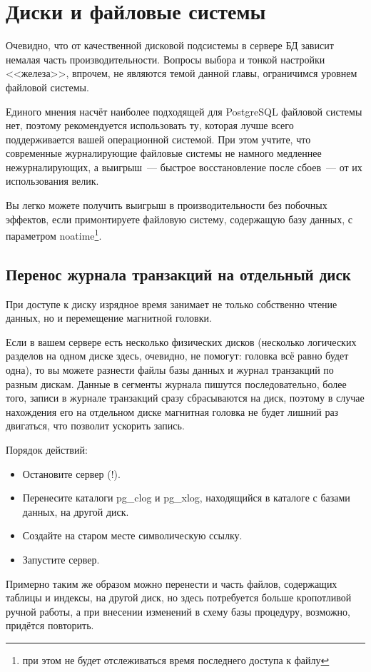 \section{Диски и файловые системы}
Очевидно, что от качественной дисковой подсистемы в сервере БД зависит немалая часть производительности. Вопросы выбора и
тонкой настройки <<железа>>, впрочем, не являются темой данной главы, ограничимся уровнем файловой системы.

Единого мнения насчёт наиболее подходящей для PostgreSQL файловой системы нет, поэтому рекомендуется использовать ту, которая лучше
всего поддерживается вашей операционной системой. При этом учтите, что современные журналирующие файловые системы не намного
медленнее нежурналирующих, а выигрыш~--- быстрое восстановление после сбоев~--- от их использования велик.

Вы легко можете получить выигрыш в производительности без побочных эффектов, если примонтируете файловую систему,
содержащую базу данных, с параметром noatime\footnote{при этом не будет отслеживаться время последнего доступа к файлу}.

\subsection{Перенос журнала транзакций на отдельный диск}
При доступе к диску изрядное время занимает не только собственно чтение данных, но и перемещение магнитной головки.

Если в вашем сервере есть несколько физических дисков (несколько логических разделов на одном диске здесь,
очевидно, не помогут: головка всё равно будет одна), то вы можете разнести файлы базы данных и журнал транзакций по разным
дискам. Данные в сегменты журнала пишутся последовательно, более того, записи в журнале транзакций сразу сбрасываются на диск,
поэтому в случае нахождения его на отдельном диске магнитная головка не будет лишний раз двигаться, что позволит ускорить запись.

Порядок действий:
\begin{itemize}
\item Остановите сервер (!).
\item Перенесите каталоги pg\_clog и pg\_xlog, находящийся в каталоге с базами данных, на другой диск.
\item Создайте на старом месте символическую ссылку.
\item Запустите сервер.
\end{itemize}

Примерно таким же образом можно перенести и часть файлов, содержащих таблицы и индексы, на другой диск, но здесь
потребуется больше кропотливой ручной работы, а при внесении изменений в схему базы процедуру, возможно, придётся повторить.

